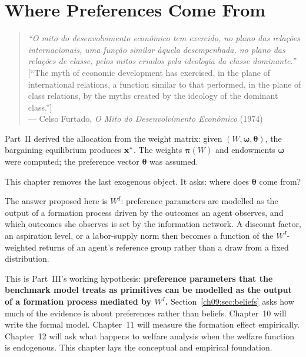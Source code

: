 \documentclass[../structural_economics_book.tex]{subfiles}
\begin{document}
\ifSubfilesClassLoaded{\setcounter{chapter}{8}}{}
\chapter{Where Preferences Come From}\label{ch:09}
\begin{quote}
\textit{``O mito do desenvolvimento econ\^{o}mico tem exercido, no plano das rela\c{c}\~{o}es internacionais, uma fun\c{c}\~{a}o similar \`{a}quela desempenhada, no plano das rela\c{c}\~{o}es de classe, pelos mitos criados pela ideologia da classe dominante.''}\\[0.3em]
\textnormal{[``The myth of economic development has exercised, in the plane of international relations, a function similar to that performed, in the plane of class relations, by the myths created by the ideology of the dominant class.'']}\\
\hfill --- Celso Furtado, \textit{O Mito do Desenvolvimento Econ\^{o}mico} (1974)
\end{quote}
\nocite{furtado1974mito}

\vspace{1em}

Part~II derived the allocation from the weight matrix: given $(W, \boldsymbol{\omega}, \boldsymbol{\theta})$, the bargaining equilibrium produces $\mathbf{x}^*$. The weights $\boldsymbol{\pi}(W)$ and endowments $\boldsymbol{\omega}$ were computed; the preference vector $\boldsymbol{\theta}$ was assumed.

This chapter removes the last exogenous object. It asks: where does $\boldsymbol{\theta}$ come from?

The answer proposed here is $W^I$: preference parameters are modelled as the output of a formation process driven by the outcomes an agent observes, and which outcomes she observes is set by the information network. A discount factor, an aspiration level, or a labor-supply norm then becomes a function of the $W^I$-weighted returns of an agent's reference group rather than a draw from a fixed distribution.

This is Part~III's working hypothesis: \textbf{preference parameters that the benchmark model treats as primitives can be modelled as the output of a formation process mediated by $W^I$.} Section~\ref{ch09:sec:beliefs} asks how much of the evidence is about preferences rather than beliefs. Chapter~10 will write the formal model. Chapter~11 will measure the formation effect empirically. Chapter~12 will ask what happens to welfare analysis when the welfare function is endogenous. This chapter lays the conceptual and empirical foundation.
\end{document}
